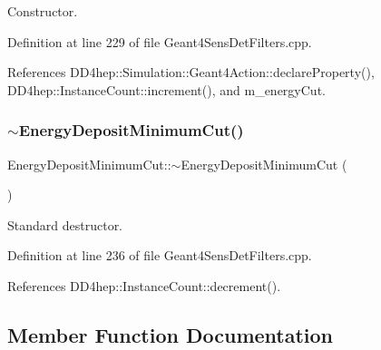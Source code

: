 Constructor. 



Definition at line 229 of file Geant4\+Sens\+Det\+Filters.\+cpp.



References D\+D4hep\+::\+Simulation\+::\+Geant4\+Action\+::declare\+Property(), D\+D4hep\+::\+Instance\+Count\+::increment(), and m\+\_\+energy\+Cut.

\hypertarget{struct_d_d4hep_1_1_simulation_1_1_energy_deposit_minimum_cut_a808a2e16dfa18be72f189409484fe50d}{}\label{struct_d_d4hep_1_1_simulation_1_1_energy_deposit_minimum_cut_a808a2e16dfa18be72f189409484fe50d} 
\subsubsection{\texorpdfstring{$\sim$\+Energy\+Deposit\+Minimum\+Cut()}{~EnergyDepositMinimumCut()}}
{\footnotesize\ttfamily Energy\+Deposit\+Minimum\+Cut\+::$\sim$\+Energy\+Deposit\+Minimum\+Cut (\begin{DoxyParamCaption}{ }\end{DoxyParamCaption})\hspace{0.3cm}{\ttfamily [virtual]}}



Standard destructor. 



Definition at line 236 of file Geant4\+Sens\+Det\+Filters.\+cpp.



References D\+D4hep\+::\+Instance\+Count\+::decrement().



\subsection{Member Function Documentation}
\hypertarget{struct_d_d4hep_1_1_simulation_1_1_energy_deposit_minimum_cut_ae2c50396bee48f509b0f2d3bc4ceee67}{}\label{struct_d_d4hep_1_1_simulation_1_1_energy_deposit_minimum_cut_ae2c50396bee48f509b0f2d3bc4ceee67} 
